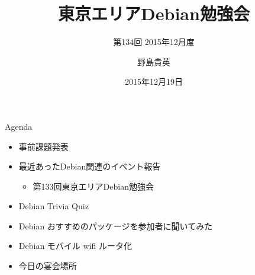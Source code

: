 \title{東京エリアDebian勉強会}
\subtitle{第134回 2015年12月度}
\author{野島貴英}
\date{2015年12月19日}



\begin{frame}
\titlepage{}
\end{frame}

\begin{frame}{Agenda}
 \begin{minipage}[t]{0.45\hsize}
  \begin{itemize}
   \item 事前課題発表
   \item 最近あったDebian関連のイベント報告
	 \begin{itemize}
	 \item 第133回東京エリアDebian勉強会
	 \end{itemize}
  \end{itemize}
 \end{minipage} 
 \begin{minipage}[t]{0.45\hsize}
  \begin{itemize}
   \item Debian Trivia Quiz
   \item Debian おすすめのパッケージを参加者に聞いてみた
   \item Debian モバイル wifi ルータ化
   \item 今日の宴会場所
  \end{itemize}
 \end{minipage}
\end{frame}

